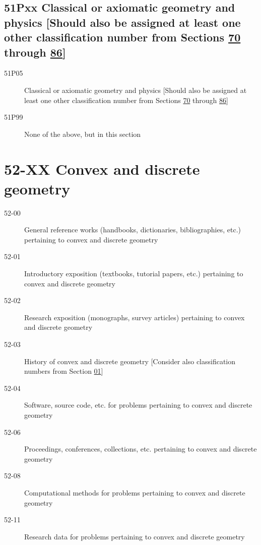 \subsection*{51Pxx Classical or axiomatic geometry and physics [Should also be assigned at least one other classification number from Sections \hyperref[70-XX]{70} through \hyperref[86-XX]{86}] }\label{51Pxx}
\begin{description} 
\item [51P05]\label{51P05} Classical or axiomatic geometry and physics [Should also be assigned at least one other classification number from Sections \hyperref[70-XX]{70} through \hyperref[86-XX]{86}]
\item [51P99]\label{51P99} None of the above, but in this section
\end{description}
\section*{52-XX Convex and discrete geometry }\label{52-XX}
\begin{description}
\item [52-00]\label{52-00} General reference works (handbooks, dictionaries, bibliographies, etc.) pertaining to convex and discrete geometry
\item [52-01]\label{52-01} Introductory exposition (textbooks, tutorial papers, etc.) pertaining to convex and discrete geometry
\item [52-02]\label{52-02} Research exposition (monographs, survey articles) pertaining to convex and discrete geometry
\item [52-03]\label{52-03} History of convex and discrete geometry [Consider also classification numbers from Section \hyperref[01-XX]{01}]
\item [52-04]\label{52-04} Software, source code, etc. for problems pertaining to convex and discrete geometry
\item [52-06]\label{52-06} Proceedings, conferences, collections, etc. pertaining to convex and discrete geometry
\item [52-08]\label{52-08} Computational methods for problems pertaining to convex and discrete geometry
\item [52-11]\label{52-11} Research data for problems pertaining to convex and discrete geometry
\end{description}
